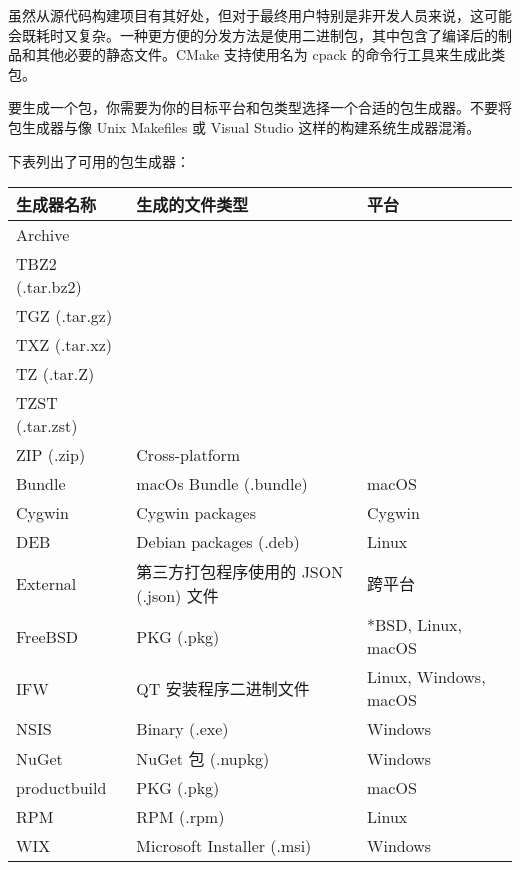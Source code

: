 虽然从源代码构建项目有其好处，但对于最终用户特别是非开发人员来说，这可能会既耗时又复杂。一种更方便的分发方法是使用二进制包，其中包含了编译后的制品和其他必要的静态文件。CMake 支持使用名为 cpack 的命令行工具来生成此类包。

要生成一个包，你需要为你的目标平台和包类型选择一个合适的包生成器。不要将包生成器与像 Unix Makefiles 或 Visual Studio 这样的构建系统生成器混淆。

下表列出了可用的包生成器：

\begin{longtable}{|l|l|l|}
\hline
\textbf{生成器名称} & \textbf{生成的文件类型}              & \textbf{平台}     \\ \hline
\endfirsthead
%
\endhead
%
Archive &
\begin{tabular}[c]{@{}l@{}}7Z, 7zip - (.7z)\\ TBZ2 (.tar.bz2)\\ TGZ (.tar.gz)\\ TXZ (.tar.xz)\\ TZ (.tar.Z)\\ TZST (.tar.zst)\\ ZIP (.zip)\end{tabular} &
Cross-platform \\ \hline
Bundle                  & macOs Bundle (.bundle)                    & macOS                 \\ \hline
Cygwin                  & Cygwin packages                           & Cygwin                \\ \hline
DEB                     & Debian packages (.deb)                    & Linux                 \\ \hline
External                & 第三方打包程序使用的 JSON (.json) 文件 & 跨平台        \\ \hline
FreeBSD                 & PKG (.pkg)                                & *BSD, Linux, macOS    \\ \hline
IFW                     & QT 安装程序二进制文件                       & Linux, Windows, macOS \\ \hline
NSIS                    & Binary (.exe)                             & Windows               \\ \hline
NuGet                   & NuGet 包 (.nupkg)                    & Windows               \\ \hline
productbuild            & PKG (.pkg)                                & macOS                 \\ \hline
RPM                     & RPM (.rpm)                                & Linux                 \\ \hline
WIX                     & Microsoft Installer (.msi)                & Windows               \\ \hline
\end{longtable}

